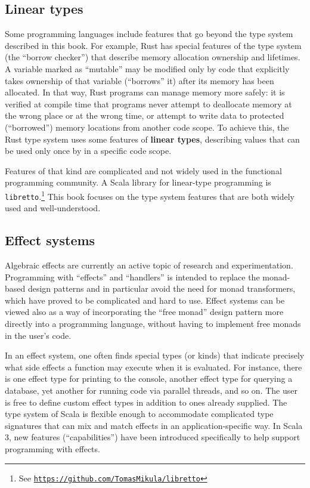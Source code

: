 \subsection{Linear types}

Some programming languages include features that go beyond the type
system described in this book. For example, Rust has special features
of the type system (the \textsf{``}borrow checker\textsf{''}) that describe memory
allocation ownership and lifetimes. A variable marked as \textsf{``}mutable\textsf{''}
may be modified only by code that explicitly takes ownership of that
variable (\textsf{``}borrows\textsf{''} it) after its memory has been allocated. In
that way, Rust programs can manage memory more safely: it is verified
at compile time that programs never attempt to deallocate memory at
the wrong place or at the wrong time, or attempt to write data to
protected (\textsf{``}borrowed\textsf{''}) memory locations from another code scope.
To achieve this, the Rust type system uses some features of \textbf{linear
types},  describing values
that can be used only once by in a specific code scope.

Features of that kind are complicated and not widely used in the functional
programming community. A Scala library for linear-type programming
is \lstinline!libretto!.\footnote{See \texttt{\href{https://github.com/TomasMikula/libretto}{https://github.com/TomasMikula/libretto}}}
This book focuses on the type system features that are both widely
used and well-understood.

\subsection{Effect systems}

Algebraic effects are currently an active topic of research and experimentation.
Programming with \textsf{``}effects\textsf{''} and \textsf{``}handlers\textsf{''} is intended to replace
the monad-based design patterns and in particular avoid the need for
monad transformers, which have proved to be complicated and hard to
use. Effect systems can be viewed also as a way of incorporating the
\textsf{``}free monad\textsf{''} design pattern more directly into a programming language,
without having to implement free monads in the user\textsf{'}s code.

In an effect system, one often finds special types (or kinds) that
indicate precisely what side effects a function may execute when it
is evaluated. For instance, there is one effect type for printing
to the console, another effect type for querying a database, yet another
for running code via parallel threads, and so on. The user is free
to define custom effect types in addition to ones already supplied.
The type system of Scala is flexible enough to accommodate complicated
type signatures that can mix and match effects in an application-specific
way. In Scala 3, new features (\textsf{``}capabilities\textsf{''}) have been introduced
specifically to help support programming with effects.

